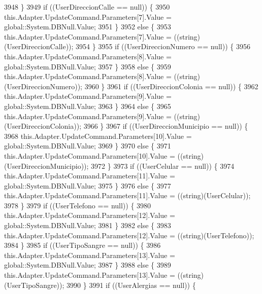 \begin{DoxyCode}
3948             \}
3949             \textcolor{keywordflow}{if} ((UserDireccionCalle == null)) \{
3950                 this.Adapter.UpdateCommand.Parameters[7].Value = global::System.DBNull.Value;
3951             \}
3952             \textcolor{keywordflow}{else} \{
3953                 this.Adapter.UpdateCommand.Parameters[7].Value = ((string)(UserDireccionCalle));
3954             \}
3955             \textcolor{keywordflow}{if} ((UserDireccionNumero == null)) \{
3956                 this.Adapter.UpdateCommand.Parameters[8].Value = global::System.DBNull.Value;
3957             \}
3958             \textcolor{keywordflow}{else} \{
3959                 this.Adapter.UpdateCommand.Parameters[8].Value = ((string)(UserDireccionNumero));
3960             \}
3961             \textcolor{keywordflow}{if} ((UserDireccionColonia == null)) \{
3962                 this.Adapter.UpdateCommand.Parameters[9].Value = global::System.DBNull.Value;
3963             \}
3964             \textcolor{keywordflow}{else} \{
3965                 this.Adapter.UpdateCommand.Parameters[9].Value = ((string)(UserDireccionColonia));
3966             \}
3967             \textcolor{keywordflow}{if} ((UserDireccionMunicipio == null)) \{
3968                 this.Adapter.UpdateCommand.Parameters[10].Value = global::System.DBNull.Value;
3969             \}
3970             \textcolor{keywordflow}{else} \{
3971                 this.Adapter.UpdateCommand.Parameters[10].Value = ((string)(UserDireccionMunicipio));
3972             \}
3973             \textcolor{keywordflow}{if} ((UserCelular == null)) \{
3974                 this.Adapter.UpdateCommand.Parameters[11].Value = global::System.DBNull.Value;
3975             \}
3976             \textcolor{keywordflow}{else} \{
3977                 this.Adapter.UpdateCommand.Parameters[11].Value = ((string)(UserCelular));
3978             \}
3979             \textcolor{keywordflow}{if} ((UserTelefono == null)) \{
3980                 this.Adapter.UpdateCommand.Parameters[12].Value = global::System.DBNull.Value;
3981             \}
3982             \textcolor{keywordflow}{else} \{
3983                 this.Adapter.UpdateCommand.Parameters[12].Value = ((string)(UserTelefono));
3984             \}
3985             \textcolor{keywordflow}{if} ((UserTipoSangre == null)) \{
3986                 this.Adapter.UpdateCommand.Parameters[13].Value = global::System.DBNull.Value;
3987             \}
3988             \textcolor{keywordflow}{else} \{
3989                 this.Adapter.UpdateCommand.Parameters[13].Value = ((string)(UserTipoSangre));
3990             \}
3991             \textcolor{keywordflow}{if} ((UserAlergias == null)) \{

\end{DoxyCode}
